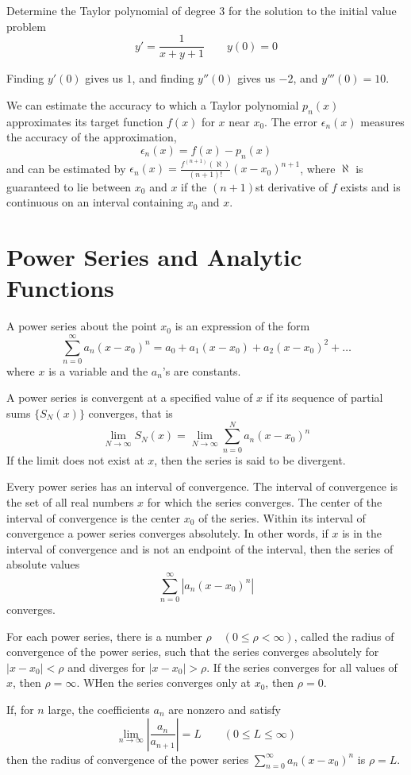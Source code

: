 \documentclass[../diffeq.tex]{subfiles}
\begin{document}
\begin{example}
    Determine the Taylor polynomial of degree $3$ for the solution to the initial value problem 
    \[ y' = \frac{1}{x+y+1} \qquad y(0)=0 \]

    Finding $y'(0)$ gives us $1$, and finding $y''(0)$ gives us $-2$, and $y'''(0)=10$.
\end{example}

We can estimate the accuracy to which a Taylor polynomial $p_n(x)$ approximates its target function $f(x)$ for $x$ near $x_0$. The error $\epsilon_n(x)$ measures the accuracy of the approximation, 
\[ \epsilon_n(x)= f(x)-p_n(x) \]
and can be estimated by $\epsilon_n(x)=\frac{f^{(n+1)}(\aleph)}{(n+1)!}(x-x_0)^{n+1}$, where $\aleph$ is guaranteed to lie between $x_0$ and $x$ if the $(n+1)$st derivative of $f$ exists and is continuous on an interval containing $x_0$ and $x$.


\section{Power Series and Analytic Functions}
A power series about the point $x_0$ is an expression of the form 
\[ \sum_{n=0}^{\infty}a_n(x-x_0)^n = a_0+a_1(x-x_0)+a_2(x-x_0)^2 + \dots \]
where $x$ is a variable and the $a_n$'s are constants.

A power series is convergent at a specified value of $x$ if its sequence of partial sums $\{S_N(x)\}$ converges, that is 
\[ \lim_{N\to \infty} S_N(x)=\lim_{N\to\infty}\sum^N_{n=0}a_n(x-x_0)^n \]
If the limit does not exist at $x$, then the series is said to be divergent.

Every power series has an interval of convergence. The interval of convergence is the set of all real numbers $x$ for which the series converges. The center of the interval of convergence is the center $x_0$ of the series. Within its 
interval of convergence a power series converges absolutely. In other words, if $x$ is in the interval of convergence and is not an endpoint of the interval, then the series of absolute values 
\[ \sum_{n=0}^{\infty} \left|a_n(x-x_0)^n\right| \]
converges.

\begin{theorem}
    For each power series, there is a number $\rho \quad (0\leq \rho < \infty)$, called the radius of convergence of the power series, such that the series converges absolutely for $|x-x_0|<\rho$ and diverges for $|x-x_0|>\rho$.
    If the series converges for all values of $x$, then $\rho=\infty$. WHen the series converges only at $x_0$, then $\rho=0$.
\end{theorem}
\pagebreak
\begin{theorem}
    If, for $n$ large, the coefficients $a_n$ are nonzero and satisfy 
    \[ \lim_{n\to \infty} \left|\frac{a_n}{a_{n+1}}\right| = L \qquad (0\leq L\leq \infty) \]
    then the radius of convergence of the power series $\sum_{n=0}^{\infty}a_n(x-x_0)^n$ is $\rho = L$.
\end{theorem}
\end{document}
